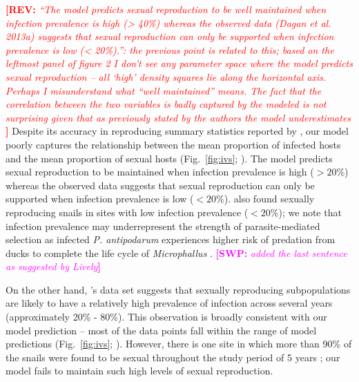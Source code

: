 \documentclass{article}\usepackage[]{graphicx}\usepackage[]{color}
\newcommand{\comment}[3]{\textcolor{#1}{\textbf{[#2: }\textit{#3}\textbf{]}}}
\newcommand{\swp}[1]{\comment{magenta}{SWP}{#1}}
\newcommand{\rev}[1]{\comment{red}{REV}{#1}}
\newcommand{\citetapos}[1]{\citeauthor{#1}'s \citeyearpar{#1}}
\newcommand{\fref}[1]{Fig.~\ref{fig:#1}}
\begin{document}
\rev{
“The model predicts sexual reproduction to be well maintained when infection prevalence is high (> 40\%) whereas the observed data (Dagan et al. 2013a) suggests that sexual reproduction can only be supported when infection prevalence is low (< 20\%).”: the previous point is related to this; based on the leftmost panel of figure 2 I don’t see any parameter space where the model predicts sexual reproduction – all ‘high’ density squares lie along the horizontal axis. Perhaps I misunderstand what “well maintained” means. The fact that the correlation between the two variables is badly captured by the modeled is not surprising given that as previously stated by the authors the model underestimates %
}
Despite its accuracy in reproducing summary statistics reported by \cite{dagan2013clonal}, 
our model poorly captures the relationship between the mean proportion of infected hosts and the mean proportion of sexual hosts (\fref{ivs}; \cite{dagan2013clonal}).
The model predicts sexual reproduction to be maintained when infection prevalence is high ($>20\%$) whereas
the observed data \citep{dagan2013clonal} suggests that sexual reproduction can only be supported when infection prevalence is low ($< 20\%$).
\cite{mckone2016fine} also found sexually reproducing snails in sites with low infection prevalence ($< 20\%$);
we note that infection prevalence may underrepresent the strength of parasite-mediated selection as
infected \textit{P. antipodarum} experiences higher risk of predation from ducks to complete the life cycle of \textit{Microphallus} \citep{levri1996effects}.
\swp{added the last sentence as suggested by Lively}

On the other hand, \citetapos{vergara2014infection} data set suggests that sexually reproducing subpopulations are likely to have a relatively high prevalence of infection across several years (approximately 20\% - 80\%).
This observation is broadly consistent with our model prediction --  
most of the data points fall within the range of model predictions (\fref{ivs}; \cite{vergara2014infection}).
However, there is one site in which more than 90\% of the snails were found to be sexual throughout the study period of 5 years \citep{vergara2014infection};
our model fails to maintain such high levels of sexual reproduction.
\end{document}
